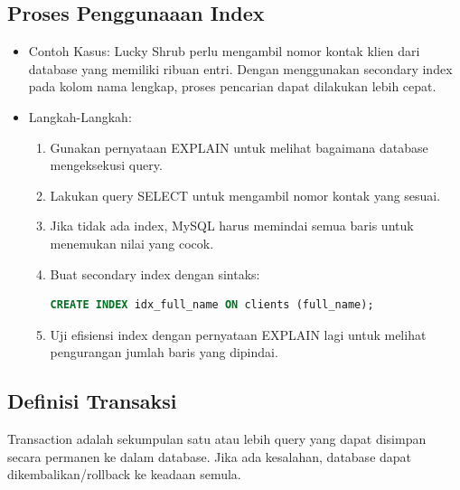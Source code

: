 \documentclass{article}
\begin{document}
\subsection{Proses Penggunaaan Index}
\begin{itemize}
    \item Contoh Kasus: Lucky Shrub perlu mengambil nomor kontak klien dari database yang memiliki ribuan entri. Dengan menggunakan secondary index pada kolom nama lengkap, proses pencarian dapat dilakukan lebih cepat.
    \item Langkah-Langkah:
          \begin{enumerate}
              \item Gunakan pernyataan EXPLAIN untuk melihat bagaimana database mengeksekusi query.
              \item Lakukan query SELECT untuk mengambil nomor kontak yang sesuai.
              \item Jika tidak ada index, MySQL harus memindai semua baris untuk menemukan nilai yang cocok.
              \item Buat secondary index dengan sintaks:
                    \begin{lstlisting}[language=SQL, caption={}, captionpos=b]  
                CREATE INDEX idx_full_name ON clients (full_name);
            \end{lstlisting}
              \item Uji efisiensi index dengan pernyataan EXPLAIN lagi untuk melihat pengurangan jumlah baris yang dipindai.
          \end{enumerate}
\end{itemize}

\subsection{Definisi Transaksi}
Transaction adalah sekumpulan satu atau lebih query yang dapat disimpan secara permanen ke dalam database. Jika ada kesalahan, database dapat dikembalikan/rollback ke keadaan semula.
\end{document}
